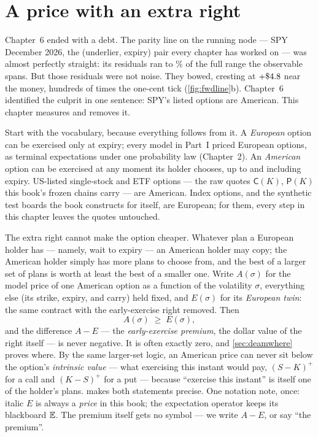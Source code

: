 \section{A price with an extra right}
\label{sec:deamright}

Chapter~6 ended with a debt.  The parity line on the running node ---
SPY December 2026, the (underlier, expiry) pair every chapter has
worked on --- was almost perfectly straight: its residuals ran to
\MacFwdLineStraightPct\% of the full range the observable spans.
But those residuals were not noise.  They bowed, cresting at
$+\$4.8$ near the money, hundreds of times the
one-cent tick (\cref{fig:fwdline}b).  Chapter~6 identified the culprit
in one sentence: SPY's listed options are American.  This chapter
measures and removes it.

Start with the vocabulary, because everything follows from it.  A
\emph{European} option can be exercised only at expiry; every model in
Part~I priced European options, as terminal expectations under one
probability law (Chapter~2).  An \emph{American} option can be
exercised at any moment its holder chooses, up to and including
expiry.  US-listed single-stock and ETF options --- the raw quotes
$\mathsf{C}(K)$, $\mathsf{P}(K)$ this book's frozen chains carry ---
are American.  Index options, and the synthetic test boards the book
constructs for itself, are European; for them, every step in this
chapter leaves the quotes untouched.

The extra right cannot make the option cheaper.  Whatever plan a
European holder has --- namely, wait to expiry --- an American holder
may copy; the American holder simply has more plans to choose from,
and the best of a larger set of plans is worth at least the best of a
smaller one.  Write $A(\sigma)$ for the model price of one American
option as a function of the volatility $\sigma$, everything else (its
strike, expiry, and carry) held fixed, and $E(\sigma)$ for its
\emph{European twin}: the same contract with the early-exercise right
removed.  Then
\[
A(\sigma)\;\ge\;E(\sigma),
\]
and the difference $A-E$ --- the \emph{early-exercise premium}, the
dollar value of the right itself --- is never negative.  It is often
exactly zero, and \cref{sec:deamwhere} proves where.  By the same
larger-set logic, an American price can never sit below the option's
\emph{intrinsic value} --- what exercising this instant would pay,
$(S-K)^+$ for a call and $(K-S)^+$ for a put --- because ``exercise
this instant'' is itself one of the holder's plans.
 makes both statements precise.  One notation
note, once: italic $E$ is always a \emph{price} in this book; the
expectation operator keeps its blackboard $\mathbb{E}$.  The premium itself
gets no symbol --- we write $A-E$, or say ``the premium''.


